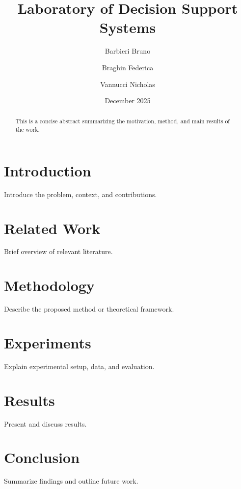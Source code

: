 \documentclass[11pt,a4paper]{article}
\title{Laboratory of Decision Support Systems}
\author{
    Barbieri Bruno\\
    \and
    Braghin Federica\\
    \and
    Vannucci Nicholas
}
\date{December 2025}
\begin{document}
\maketitle

\begin{abstract}
This is a concise abstract summarizing the motivation, method, and main results of the work.
\end{abstract}

\section{Introduction}
Introduce the problem, context, and contributions.

\section{Related Work}
Brief overview of relevant literature.

\section{Methodology}
Describe the proposed method or theoretical framework.

\section{Experiments}
Explain experimental setup, data, and evaluation.

\section{Results}
Present and discuss results.

\section{Conclusion}
Summarize findings and outline future work.



\end{document}
